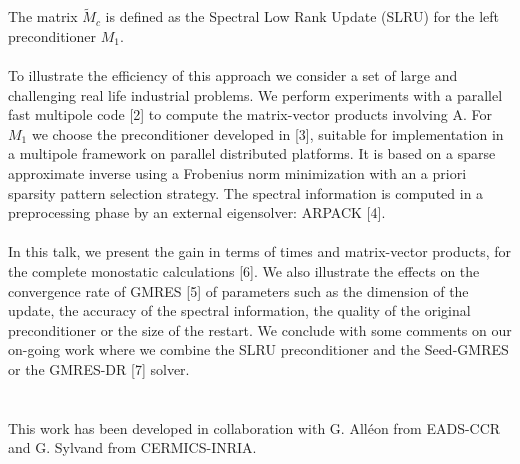 \documentclass{report}
\begin{document}
The matrix ${\tilde{M}}_c$ is defined as the Spectral Low Rank Update
(SLRU) for the left preconditioner $M_1$.\\
\\
To illustrate the efficiency of this approach we consider a set of large
and challenging real life industrial problems.
We perform experiments with a parallel fast multipole code [2] to compute
the matrix-vector products involving A.
For $M_1$ we choose the preconditioner developed in [3], suitable for
implementation in a multipole framework on parallel distributed
platforms.
It is based on a sparse approximate inverse using a Frobenius norm
minimization with an a priori sparsity pattern selection strategy.
The spectral information is computed in a preprocessing phase by an
external eigensolver: ARPACK [4].\\
\\
In this talk, we present the gain in terms of times and matrix-vector
products, for the complete monostatic calculations [6].
We also illustrate the effects on the convergence rate of GMRES [5] of
parameters such as the dimension of the update, the accuracy
of the spectral information, the quality of the original preconditioner
or the size of the restart.
We conclude with some comments on our on-going work where we combine the
SLRU preconditioner and the Seed-GMRES or the GMRES-DR [7] solver.\\
\\
\\
This work has been developed in collaboration with G. All{\'e}on from
EADS-CCR and G. Sylvand from CERMICS-INRIA.\\
\\
\\
\end{document}
